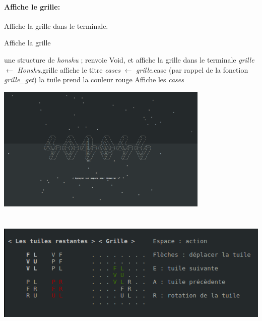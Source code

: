 \documentclass[10pt]{article}
\begin{document}
  \paragraph{Affiche le grille:}Affiche la grille dans le terminale.
    \begin{algorithm}
      \caption{Affiche la grille}
      \begin{algorithmic}
	\REQUIRE  une structure de \textit{honshu} ;
	\ENSURE renvoie Void, et affiche la grille dans le terminale
	\STATE \textit{grille} $\leftarrow$ \textit{Honshu}.grille
	\STATE affiche le titre
	\STATE \textit{cases} $\leftarrow$ \textit{grille}.case (par rappel de la fonction \textit{grille\_get})
	\STATE la tuile prend la couleur rouge
	\ENDIF
	\ENDIF
	\STATE Affiche les \textit{cases}
	\ENDFOR
      \end{algorithmic}
    \end{algorithm}
    \begin{center}
      \includegraphics[height=6cm,keepaspectratio]{../images/menu_ncurses.png}
    \end{center}
    \begin{center}
      \includegraphics[height=6cm,keepaspectratio]{../images/grille_ncurses.png}
    \end{center}
\end{document}

